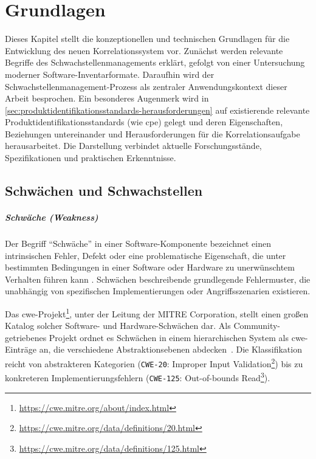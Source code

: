 \chapter{Grundlagen}\label{ch:grundlagen}

Dieses Kapitel stellt die konzeptionellen und technischen Grundlagen für die Entwicklung des neuen Korrelationssystem vor.
Zunächst werden relevante Begriffe des Schwachstellenmanagements erklärt, gefolgt von einer Untersuchung moderner Software-Inventarformate.
Daraufhin wird der Schwachstellenmanagement-Prozess als zentraler Anwendungskontext dieser Arbeit besprochen.
Ein besonderes Augenmerk wird in \autoref{sec:produktidentifikationsstandards-herausforderungen} auf existierende relevante Produktidentifikationsstandards (wie \acrshort{cpe}) gelegt und deren Eigenschaften, Beziehungen untereinander und Herausforderungen für die Korrelationsaufgabe herausarbeitet.
Die Darstellung verbindet aktuelle Forschungsstände, Spezifikationen und praktischen Erkenntnisse.

\section{Schwächen und Schwachstellen}\label{sec:def-weakness-vulnerability}

\paragraph{Schwäche (Weakness)}

Der Begriff \enquote{Schwäche} in einer Software-Komponente bezeichnet einen intrinsischen Fehler, Defekt oder eine problematische Eigenschaft, die unter bestimmten Bedingungen in einer Software oder Hardware zu unerwünschtem Verhalten führen kann \autocite{Ross_Winstead_McEvilley_2022}.
Schwächen beschreibende grundlegende Fehlermuster, die unabhängig von spezifischen Implementierungen oder Angriffsszenarien existieren.

Das \acrfull{cwe}-Projekt\footnote{\url{https://cwe.mitre.org/about/index.html}}, unter der Leitung der MITRE Corporation, stellt einen großen Katalog solcher Software- und Hardware-Schwächen dar.
Als Community-getriebenes Projekt ordnet es Schwächen in einem hierarchischen System als \acrshort{cwe}-Einträge an, die verschiedene Abstraktionsebenen abdecken\ \autocite{wu2016cwe}.
Die Klassifikation reicht von abstrakteren Kategorien (\verb+CWE-20+: Improper Input Validation\footnote{\url{https://cwe.mitre.org/data/definitions/20.html}}) bis zu konkreteren Implementierungsfehlern (\verb+CWE-125+: Out-of-bounds Read\footnote{\url{https://cwe.mitre.org/data/definitions/125.html}}).


